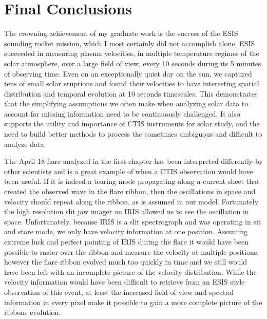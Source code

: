 \chapter{Final Conclusions}\label{conclusion}

The crowning achievement of my graduate work is the success of the ESIS sounding rocket mission, which I most certainly did not accomplish alone.
ESIS succeeded in measuring plasma velocities, in multiple temperature regimes of the solar atmosphere, over a large field of view, every 10 seconds during its 5 minutes of observing time.
Even on an exceptionally quiet day on the sun, we captured tens of small solar eruptions and found their velocities to have interesting spatial distribution and temporal evolution at 10 seconds timescales.
This demonstrates that the simplifying assumptions we often make when analyzing solar data to account for missing information need to be continuously challenged.
It also supports the utility and importance of CTIS instruments for solar study, and the need to build better methods to process the sometimes ambiguous and difficult to analyze data.

The April 18 flare analyzed in the first chapter has been interpreted differently by other scientists and is a great example of when a CTIS observation would have been useful.
If it is indeed a tearing mode propagating along a current sheet that created the observed wave in the flare ribbon, then the oscillations in space and velocity should repeat along the ribbon, as is assumed in our model.
Fortunately the high resolution slit jaw imager on IRIS allowed us to see the oscillation in space.
Unfortunately, because IRIS is a slit spectrograph and was operating in sit and stare mode, we only have velocity information at one position.
Assuming extreme luck and perfect pointing of IRIS during the flare it would have been possible to raster over the ribbon and measure the velocity at multiple positions, however the flare ribbon evolved much too quickly in time and we still would have been left with an incomplete picture of the velocity distribution.
While the velocity information would have been difficult to retrieve from an ESIS style observation of this event, at least the increased field of view and spectral information in every pixel make it possible to gain a more complete picture of the ribbons evolution.

